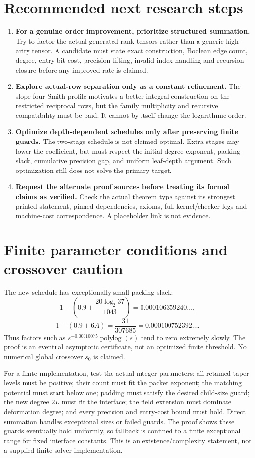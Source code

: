 \documentclass[11pt,letterpaper]{article}
\newcommand{\polylog}{\operatorname{polylog}}
\begin{document}
\section{Recommended next research steps}
\begin{enumerate}
\item \textbf{For a genuine order improvement, prioritize structured summation.} Try to
factor the actual generated rank tensors rather than a generic high-arity tensor. A candidate
must state exact construction, Boolean edge count, degree, entry bit-cost, precision lifting,
invalid-index handling and recursion closure before any improved rate is claimed.
\item \textbf{Explore actual-row separation only as a constant refinement.} The slope-four
Smith profile motivates a better integral construction on the restricted reciprocal rows,
but the family multiplicity and recursive compatibility must be paid. It cannot by itself
change the logarithmic order.
\item \textbf{Optimize depth-dependent schedules only after preserving finite guards.}
The two-stage schedule is not claimed optimal. Extra stages may lower the coefficient,
but must respect the initial degree exponent, packing slack, cumulative precision gap,
and uniform leaf-depth argument. Such optimization still does not solve the primary target.
\item \textbf{Request the alternate proof sources before treating its formal claims as verified.}
Check the actual theorem type against its strongest printed statement, pinned dependencies,
axioms, full kernel/checker logs and machine-cost correspondence. A placeholder link is not evidence.
\end{enumerate}

\appendix
\section{Finite parameter conditions and crossover caution}
The new schedule has exceptionally small packing slack:
\[
 1-\left(0.9+\frac{20\log_2 37}{1043}\right)
 =0.000106359240\ldots,
\]
\[
 1-(0.9+6A)=\frac{31}{307685}=0.000100752392\ldots.
\]
Thus factors such as $s^{-0.00010075}\polylog(s)$ tend to zero extremely slowly.
The proof is an eventual asymptotic certificate, not an optimized finite threshold.
No numerical global crossover $s_0$ is claimed.

For a finite implementation, test the actual integer parameters: all retained taper levels
must be positive; their count must fit the packet exponent; the matching potential must start
below one; padding must satisfy the desired child-size guard; the new degree $2L$ must fit the
interface; the field extension must dominate deformation degree; and every precision and
entry-cost bound must hold. Direct summation handles exceptional sizes or failed guards.
The proof shows these guards eventually hold uniformly, so fallback is confined to a finite
exceptional range for fixed interface constants. This is an existence/complexity statement,
not a supplied finite solver implementation.
\end{document}
